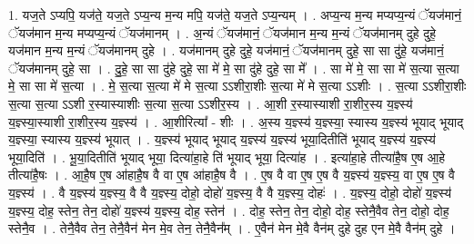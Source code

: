 \documentclass[17pt]{extarticle}
\begin{document}
1. यज॒ते ऽप्यपि॒ यज॑ते॒ यज॒ते ऽप्य॒न्य म॒न्य मपि॒ यज॑ते॒ यज॒ते ऽप्य॒न्यम् । . अप्य॒न्य म॒न्य मप्यप्य॒न्यं ॅयज॑मानं॒ ॅयज॑मान म॒न्य मप्यप्य॒न्यं ॅयज॑मानम् । . अ॒न्यं ॅयज॑मानं॒ ॅयज॑मान म॒न्य म॒न्यं ॅयज॑मानम् दुहे दुहे॒ यज॑मान म॒न्य म॒न्यं ॅयज॑मानम् दुहे । . यज॑मानम् दुहे दुहे॒ यज॑मानं॒ ॅयज॑मानम् दुहे॒ सा सा दु॑हे॒ यज॑मानं॒ ॅयज॑मानम् दुहे॒ सा । . दु॒हे॒ सा सा दु॑हे दुहे॒ सा मे॑ मे॒ सा दु॑हे दुहे॒ सा मे᳚ । . सा मे॑ मे॒ सा सा मे॑ स॒त्या स॒त्या मे॒ सा सा मे॑ स॒त्या । . मे॒ स॒त्या स॒त्या मे॑ मे स॒त्या ऽऽशीरा॒शीः स॒त्या मे॑ मे स॒त्या ऽऽशीः । . स॒त्या ऽऽशीरा॒शीः स॒त्या स॒त्या ऽऽशी र॒स्यास्याशीः स॒त्या स॒त्या ऽऽशीर॒स्य । . आ॒शी र॒स्यास्याशी रा॒शीर॒स्य य॒ज्ञ्स्य॑ य॒ज्ञ्स्या॒स्याशी रा॒शीर॒स्य य॒ज्ञ्स्य॑ । . आ॒शीरित्या᳚ - शीः । . अ॒स्य य॒ज्ञ्स्य॑ य॒ज्ञ्स्या॒ स्यास्य य॒ज्ञ्स्य॑ भूयाद् भूयाद् य॒ज्ञ्स्या॒ स्यास्य य॒ज्ञ्स्य॑ भूयात् । . य॒ज्ञ्स्य॑ भूयाद् भूयाद् य॒ज्ञ्स्य॑ य॒ज्ञ्स्य॑ भूया॒दितीति॑ भूयाद् य॒ज्ञ्स्य॑ य॒ज्ञ्स्य॑ भूया॒दिति॑ । . भू॒या॒दितीति॑ भूयाद् भूया॒ दित्या॑हा॒हे ति॑ भूयाद् भूया॒ दित्या॑ह । . इत्या॑हा॒हे तीत्या॑है॒ष ए॒ष आ॒हे तीत्या॑है॒षः । . आ॒है॒ष ए॒ष आ॑हाहै॒ष वै वा ए॒ष आ॑हाहै॒ष वै । . ए॒ष वै वा ए॒ष ए॒ष वै य॒ज्ञ्स्य॑ य॒ज्ञ्स्य॒ वा ए॒ष ए॒ष वै य॒ज्ञ्स्य॑ । . वै य॒ज्ञ्स्य॑ य॒ज्ञ्स्य॒ वै वै य॒ज्ञ्स्य॒ दोहो॒ दोहो॑ य॒ज्ञ्स्य॒ वै वै य॒ज्ञ्स्य॒ दोहः॑ । . य॒ज्ञ्स्य॒ दोहो॒ दोहो॑ य॒ज्ञ्स्य॑ य॒ज्ञ्स्य॒ दोह॒ स्तेन॒ तेन॒ दोहो॑ य॒ज्ञ्स्य॑ य॒ज्ञ्स्य॒ दोह॒ स्तेन॑ । . दोह॒ स्तेन॒ तेन॒ दोहो॒ दोह॒ स्तेनै॒वैव तेन॒ दोहो॒ दोह॒ स्तेनै॒व । . तेनै॒वैव तेन॒ तेनै॒वैन॑ मेन मे॒व तेन॒ तेनै॒वैन᳚म् । . ए॒वैन॑ मेन मे॒वै वैन॑म् दुहे दुह एन मे॒वै वैन॑म् दुहे । \newline
\end{document}

